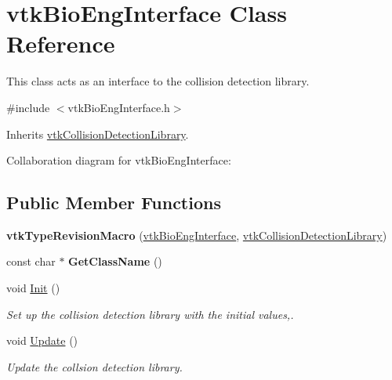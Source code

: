 \hypertarget{classvtkBioEngInterface}{
\section{vtkBioEngInterface Class Reference}
\label{classvtkBioEngInterface}
}


This class acts as an interface to the collision detection library.  




{\ttfamily \#include $<$vtkBioEngInterface.h$>$}



Inherits \hyperlink{classvtkCollisionDetectionLibrary}{vtkCollisionDetectionLibrary}.



Collaboration diagram for vtkBioEngInterface:\subsection*{Public Member Functions}
\begin{DoxyCompactItemize}
\item 
\hypertarget{classvtkBioEngInterface_afe62020c4d9112e40fdc089297defa5e}{
{\bfseries vtkTypeRevisionMacro} (\hyperlink{classvtkBioEngInterface}{vtkBioEngInterface}, \hyperlink{classvtkCollisionDetectionLibrary}{vtkCollisionDetectionLibrary})}
\label{classvtkBioEngInterface_afe62020c4d9112e40fdc089297defa5e}

\item 
\hypertarget{classvtkBioEngInterface_a42df0bc0bdc717fb6c6eb187ac61523a}{
const char $\ast$ {\bfseries GetClassName} ()}
\label{classvtkBioEngInterface_a42df0bc0bdc717fb6c6eb187ac61523a}

\item 
void \hyperlink{classvtkBioEngInterface_a52f71a20ab8e16bbeb357642975a5b67}{Init} ()
\begin{DoxyCompactList}\small\item\em Set up the collision detection library with the initial values,. \item\end{DoxyCompactList}\item 
void \hyperlink{classvtkBioEngInterface_af04a067b7a6f524faa7ff14552147260}{Update} ()
\begin{DoxyCompactList}\small\item\em Update the collsion detection library. \item\end{DoxyCompactList}\end{DoxyCompactItemize}
